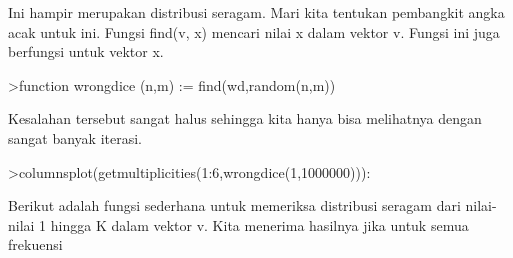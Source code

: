 \documentclass[12pt,arial,letterpaper]{book}
\begin{document}
\begin{eulercomment}
\begin{eulercomment}
\begin{eulercomment}
\begin{eulercomment}
\begin{eulercomment}
\begin{eulercomment}
\begin{eulercomment}
\begin{eulercomment}
\begin{eulercomment}
\begin{eulercomment}
\begin{eulercomment}
\begin{eulercomment}
\begin{eulercomment}
\begin{eulercomment}
\begin{eulercomment}
\begin{eulercomment}
\begin{eulercomment}
\begin{eulercomment}
\begin{eulercomment}
\begin{eulercomment}
\begin{eulercomment}
\begin{eulercomment}
\begin{eulercomment}
\begin{eulercomment}
\begin{eulercomment}
\begin{eulercomment}
\begin{eulercomment}
\begin{eulercomment}
\begin{eulercomment}
\begin{eulercomment}
\begin{eulercomment}
\begin{eulercomment}
\begin{eulercomment}
Ini hampir merupakan distribusi seragam. Mari kita tentukan pembangkit
angka acak untuk ini. Fungsi find(v, x) mencari nilai x dalam vektor
v. Fungsi ini juga berfungsi untuk vektor x.
\end{eulercomment}
\begin{eulerprompt}
>function wrongdice (n,m) := find(wd,random(n,m))
\end{eulerprompt}
\begin{eulercomment}
Kesalahan tersebut sangat halus sehingga kita hanya bisa melihatnya
dengan sangat banyak iterasi.
\end{eulercomment}
\begin{eulerprompt}
>columnsplot(getmultiplicities(1:6,wrongdice(1,1000000))):
\end{eulerprompt}
\begin{eulercomment}
Berikut adalah fungsi sederhana untuk memeriksa distribusi seragam
dari nilai-nilai 1 hingga K dalam vektor v. Kita menerima hasilnya
jika untuk semua frekuensi


\end{eulercomment}
\end{eulercomment}
\end{eulercomment}
\end{eulercomment}
\end{eulercomment}
\end{eulercomment}
\end{eulercomment}
\end{eulercomment}
\end{eulercomment}
\end{eulercomment}
\end{eulercomment}
\end{eulercomment}
\end{eulercomment}
\end{eulercomment}
\end{eulercomment}
\end{eulercomment}
\end{eulercomment}
\end{eulercomment}
\end{eulercomment}
\end{eulercomment}
\end{eulercomment}
\end{eulercomment}
\end{eulercomment}
\end{eulercomment}
\end{eulercomment}
\end{eulercomment}
\end{eulercomment}
\end{eulercomment}
\end{eulercomment}
\end{eulercomment}
\end{eulercomment}
\end{eulercomment}
\end{eulercomment}
\end{document}
